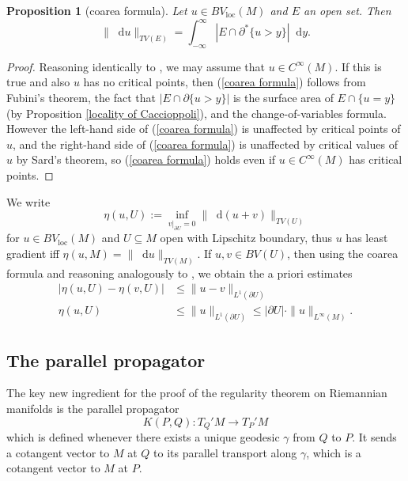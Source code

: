 \documentclass[reqno,11pt]{amsart}
\newcommand*\dif{\mathop{}\!\mathrm{d}}
\newcommand{\loc}{\mathrm{loc}}
\newtheorem{proposition}[theorem]{Proposition}
\theoremstyle{definition}
\numberwithin{equation}{section}
\begin{document}

\begin{proposition}[coarea formula]\label{Coarea2}
Let $u \in BV_\loc(M)$ and $E$ an open set. Then
\begin{equation}\label{coarea formula}
\|\dif u\|_{TV(E)} = \int_{-\infty}^\infty |E \cap \partial^* \{u > y\}| \dif y.
\end{equation}
\end{proposition}
\begin{proof}
Reasoning identically to \cite[Theorem 1.23]{Giusti77}, we may assume that $u \in C^\infty(M)$.
If this is true and also $u$ has no critical points, then (\ref{coarea formula}) follows from Fubini's theorem, the fact that $|E \cap \partial \{u > y\}|$ is the surface area of $E \cap \{u = y\}$ (by Proposition \ref{locality of Caccioppoli}), and the change-of-variables formula.
However the left-hand side of (\ref{coarea formula}) is unaffected by critical points of $u$, and the right-hand side of (\ref{coarea formula}) is unaffected by critical values of $u$ by Sard's theorem, so (\ref{coarea formula}) holds even if $u \in C^\infty(M)$ has critical points.
\end{proof}


We write
$$\eta(u, U) := \inf_{v|_{\partial U} = 0} \|\dif(u + v)\|_{TV(U)}$$
for $u \in BV_\loc(M)$ and $U \subseteq M$ open with Lipschitz boundary, thus $u$ has least gradient iff $\eta(u, M) = \|\dif u\|_{TV(M)}$.
If $u, v \in BV(U)$, then using the coarea formula and reasoning analogously to \cite[Lemma 5.6]{Giusti77}, we obtain the a priori estimates
\begin{align}
|\eta(u, U) - \eta(v, U)| &\leq \|u - v\|_{L^1(\partial U)} \label{a priori estimate 1} \\
\eta(u, U) &\leq \|u\|_{L^1(\partial U)} \leq |\partial U| \cdot \|u\|_{L^\infty(M)}. \label{a priori estimate 2}
\end{align}

\subsection{The parallel propagator}
The key new ingredient for the proof of the regularity theorem on Riemannian manifolds is the parallel propagator
$$K(P, Q): T_Q'M \to T_P'M$$
which is defined whenever there exists a unique geodesic $\gamma$ from $Q$ to $P$.
It sends a cotangent vector to $M$ at $Q$ to its parallel transport along $\gamma$, which is a cotangent vector to $M$ at $P$.
\end{document}
